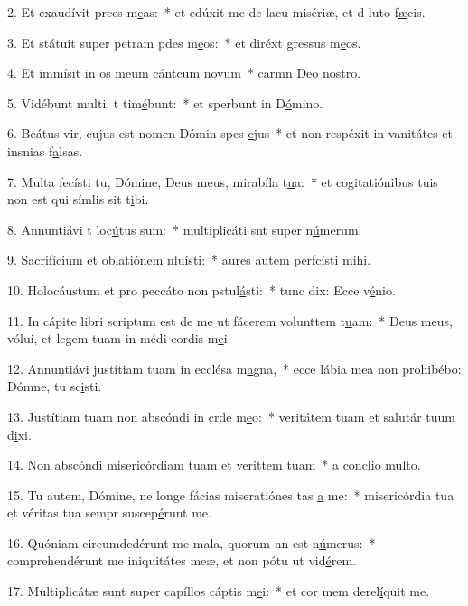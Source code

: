 2. Et exaudívit prces m\uline{e}as:~* et edúxit me de lacu misériæ, et d luto f\uline{æ}cis.\par 
3. Et státuit super petram pdes m\uline{e}os:~* et diréxt gressus m\uline{e}os.\par 
4. Et immísit in os meum cántcum n\uline{o}vum~* carmn Deo n\uline{o}stro.\par 
5. Vidébunt multi, t tim\uline{é}bunt:~* et sperbunt in D\uline{ó}mino.\par 
6. Beátus vir, cujus est nomen Dómin spes \uline{e}jus~* et non respéxit in vanitátes et insnias f\uline{a}lsas.\par 
7. Multa fecísti tu, Dómine, Deus meus, mirabíla t\uline{u}a:~* et cogitatiónibus tuis non est qui símlis sit t\uline{i}bi.\par 
8. Annuntiávi t loc\uline{ú}tus sum:~* multiplicáti snt super n\uline{ú}merum.\par 
9. Sacrifícium et oblatiónem nlu\uline{í}sti:~* aures autem perfcísti m\uline{i}hi.\par 
10. Holocáustum et pro peccáto non pstul\uline{á}sti:~* tunc dix: Ecce v\uline{é}nio.\par 
11. In cápite libri scriptum est de me ut fácerem volunttem t\uline{u}am:~* Deus meus, vólui, et legem tuam in médi cordis m\uline{e}i.\par 
12. Annuntiávi justítiam tuam in ecclésa m\uline{a}gna,~* ecce lábia mea non prohibébo: Dómne, tu sc\uline{i}sti.\par 
13. Justítiam tuam non abscóndi in crde m\uline{e}o:~* veritátem tuam et salutár tuum d\uline{i}xi.\par 
14. Non abscóndi misericórdiam tuam et verittem t\uline{u}am~* a conclio m\uline{u}lto.\par 
15. Tu autem, Dómine, ne longe fácias miseratiónes tas \uline{a} me:~* misericórdia tua et véritas tua sempr suscep\uline{é}runt me.\par 
16. Quóniam circumdedérunt me mala, quorum nn est n\uline{ú}merus:~* comprehendérunt me iniquitátes meæ, et non pótu ut vid\uline{é}rem.\par 
17. Multiplicátæ sunt super capíllos cáptis m\uline{e}i:~* et cor mem derel\uline{í}quit me.\par 
